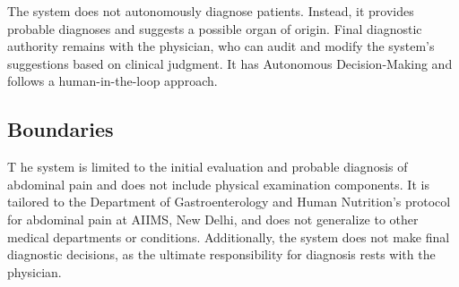 \noindent The system does not autonomously diagnose patients. Instead, it provides probable diagnoses and suggests a possible organ of origin. Final diagnostic authority remains with the physician, who can audit and modify the system's suggestions based on clinical judgment. It has Autonomous Decision-Making and follows a human-in-the-loop approach.

\subsection{Boundaries}
\lettrine{T}{ }he system is limited to the initial evaluation and probable diagnosis of abdominal pain and does not include physical examination components. It is tailored to the Department of Gastroenterology and Human Nutrition's protocol for abdominal pain at AIIMS, New Delhi, and does not generalize to other medical departments or conditions. Additionally, the system does not make final diagnostic decisions, as the ultimate responsibility for diagnosis rests with the physician.